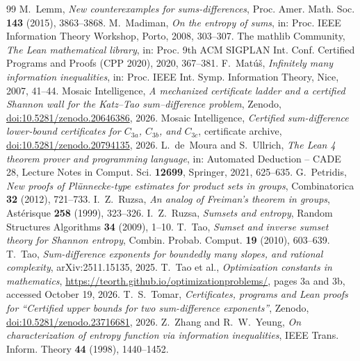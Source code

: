 \documentclass[11pt]{amsart}
\theoremstyle{definition}
\theoremstyle{remark}
\numberwithin{equation}{section}
\newcommand{\ZenodoDOI}{10.5281/zenodo.23716681}
\begin{document}
\begin{thebibliography}{99}
 M.~Lemm, \emph{New counterexamples for sums-differences}, Proc. Amer. Math. Soc. \textbf{143} (2015), 3863--3868.
 M.~Madiman, \emph{On the entropy of sums}, in: Proc. IEEE Information Theory Workshop, Porto, 2008, 303--307.
 The mathlib Community, \emph{The Lean mathematical library}, in: Proc. 9th ACM SIGPLAN Int. Conf. Certified Programs and Proofs (CPP 2020), 2020, 367--381.
 F.~Mat\'u\v{s}, \emph{Infinitely many information inequalities}, in: Proc. IEEE Int. Symp. Information Theory, Nice, 2007, 41--44.
 Mosaic Intelligence, \emph{A mechanized certificate ladder and a certified Shannon wall for the Katz--Tao sum--difference problem}, Zenodo, \href{https://doi.org/10.5281/zenodo.20646386}{doi:10.5281/zenodo.20646386}, 2026.
 Mosaic Intelligence, \emph{Certified sum-difference lower-bound certificates for $C_{3a}$, $C_{3b}$, and $C_{3c}$}, certificate archive, \href{https://doi.org/10.5281/zenodo.20794135}{doi:10.5281/zenodo.20794135}, 2026.
 L.~de~Moura and S.~Ullrich, \emph{The Lean 4 theorem prover and programming language}, in: Automated Deduction -- CADE 28, Lecture Notes in Comput. Sci. \textbf{12699}, Springer, 2021, 625--635.
 G.~Petridis, \emph{New proofs of Pl\"unnecke-type estimates for product sets in groups}, Combinatorica \textbf{32} (2012), 721--733.
 I.~Z.~Ruzsa, \emph{An analog of Freiman's theorem in groups}, Ast\'erisque \textbf{258} (1999), 323--326.
 I.~Z.~Ruzsa, \emph{Sumsets and entropy}, Random Structures Algorithms \textbf{34} (2009), 1--10.
 T.~Tao, \emph{Sumset and inverse sumset theory for Shannon entropy}, Combin. Probab. Comput. \textbf{19} (2010), 603--639.
 T.~Tao, \emph{Sum-difference exponents for boundedly many slopes, and rational complexity}, arXiv:2511.15135, 2025.
 T.~Tao et al., \emph{Optimization constants in mathematics}, \url{https://teorth.github.io/optimizationproblems/}, pages 3a and 3b, accessed October 19, 2026.
 T.~S.~Tomar, \emph{Certificates, programs and Lean proofs for ``Certified upper bounds for two sum-difference exponents''}, Zenodo, \href{https://doi.org/\ZenodoDOI}{doi:\ZenodoDOI}, 2026.
 Z.~Zhang and R.~W.~Yeung, \emph{On characterization of entropy function via information inequalities}, IEEE Trans. Inform. Theory \textbf{44} (1998), 1440--1452.
\end{thebibliography}
\end{document}

